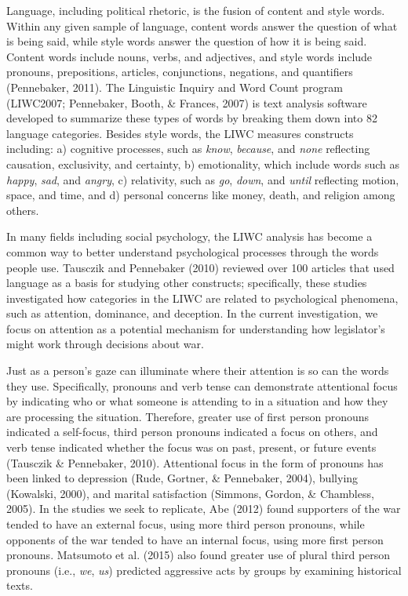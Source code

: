 \documentclass[english,,man]{apa6}
\begin{document}
Language, including political rhetoric, is the fusion of content and style words. Within any given sample of language, content words answer the question of what is being said, while style words answer the question of how it is being said. Content words include nouns, verbs, and adjectives, and style words include pronouns, prepositions, articles, conjunctions, negations, and quantifiers (Pennebaker, 2011). The Linguistic Inquiry and Word Count program (LIWC2007; Pennebaker, Booth, \& Frances, 2007) is text analysis software developed to summarize these types of words by breaking them down into 82 language categories. Besides style words, the LIWC measures constructs including: a) cognitive processes, such as \emph{know}, \emph{because}, and \emph{none} reflecting causation, exclusivity, and certainty, b) emotionality, which include words such as \emph{happy}, \emph{sad}, and \emph{angry}, c) relativity, such as \emph{go}, \emph{down}, and \emph{until} reflecting motion, space, and time, and d) personal concerns like money, death, and religion among others.

In many fields including social psychology, the LIWC analysis has become a common way to better understand psychological processes through the words people use. Tausczik and Pennebaker (2010) reviewed over 100 articles that used language as a basis for studying other constructs; specifically, these studies investigated how categories in the LIWC are related to psychological phenomena, such as attention, dominance, and deception. In the current investigation, we focus on attention as a potential mechanism for understanding how legislator's might work through decisions about war.

Just as a person's gaze can illuminate where their attention is so can the words they use. Specifically, pronouns and verb tense can demonstrate attentional focus by indicating who or what someone is attending to in a situation and how they are processing the situation. Therefore, greater use of first person pronouns indicated a self-focus, third person pronouns indicated a focus on others, and verb tense indicated whether the focus was on past, present, or future events (Tausczik \& Pennebaker, 2010). Attentional focus in the form of pronouns has been linked to depression (Rude, Gortner, \& Pennebaker, 2004), bullying (Kowalski, 2000), and marital satisfaction (Simmons, Gordon, \& Chambless, 2005). In the studies we seek to replicate, Abe (2012) found supporters of the war tended to have an external focus, using more third person pronouns, while opponents of the war tended to have an internal focus, using more first person pronouns. Matsumoto et al. (2015) also found greater use of plural third person pronouns (i.e., \emph{we}, \emph{us}) predicted aggressive acts by groups by examining historical texts.
\end{document}
